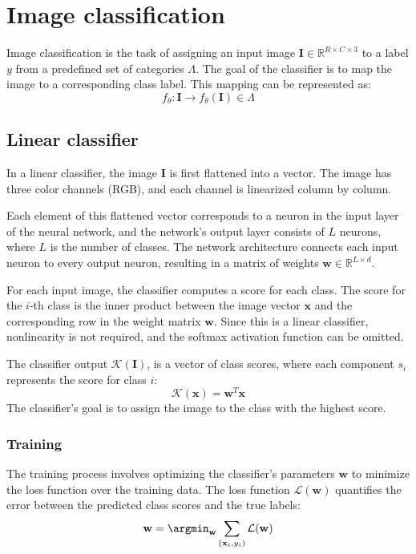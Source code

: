 \section{Image classification}

Image classification is the task of assigning an input image $\mathbf{I}\in\mathbb{R}^{R\times C \times 3}$ to a label $y$ from a predefined set of categories $\Lambda$. 
The goal of the classifier is to map the image to a corresponding class label. 
This mapping can be represented as:
\[f_\theta:\mathbf{I} \rightarrow f_\theta(\mathbf{I})\in\Lambda\]

\subsection{Linear classifier}
In a linear classifier, the image $\mathbf{I}$ is first flattened into a vector.
The image has three color channels (RGB), and each channel is linearized column by column.

Each element of this flattened vector corresponds to a neuron in the input layer of the neural network, and the network's output layer consists of $L$ neurons, where $L$ is the number of classes.
The network architecture connects each input neuron to every output neuron, resulting in a matrix of weights $\mathbf{w}\in\mathbb{R}^{L\times d}$. 

For each input image, the classifier computes a score for each class.
The score for the $i$-th class is the inner product between the image vector $\mathbf{x}$ and the corresponding row in the weight matrix $\mathbf{w}$. 
Since this is a linear classifier, nonlinearity is not required, and the softmax activation function can be omitted.

The classifier output $\mathcal{K}(\mathbf{I})$, is a vector of class scores, where each component $s_i$ represents the score for class $i$:
\[\mathcal{K}(\mathbf{x})=\mathbf{w}^T\mathbf{x}\]
The classifier's goal is to assign the image to the class with the highest score.

\subsubsection{Training}
The training process involves optimizing the classifier's parameters $\mathbf{w}$ to minimize the loss function over the training data.
The loss function $\mathcal{L}(\mathbf{w})$ quantifies the error between the predicted class scores and the true labels:
\[\mathbf{w}=\argmin_{\mathbf{w}}\sum_{(\mathbf{x}_i,y_i)}\mathcal{L}(\mathbf{w})\]

